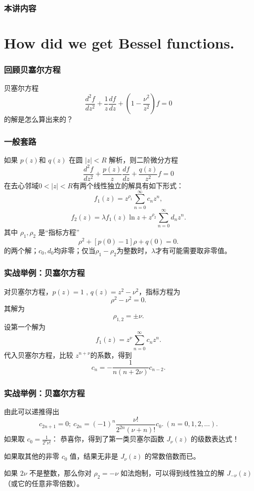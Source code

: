 \documentclass[CJK]{beamer}
\date{}
\begin{document}
  \bch
{}




\begin{frame}
\frametitle{本讲内容}
\tableofcontents
\end{frame}

\section{How did we get Bessel functions.}

\begin{frame}
  \frametitle{回顾贝塞尔方程}
  贝塞尔方程
  $$\frac{d^2f}{dz^2} + \frac{1}{z} \frac{df}{dz} + \left(1-\frac{\nu^2}{z^2}\right) f = 0 $$
  的解是怎么算出来的？
\end{frame}


\begin{frame}
  \frametitle{一般套路}
  如果  $p(z)$和 $q(z)$ 在圆 $|z|<R$ 解析，则二阶微分方程
  $$\frac{d^2f}{dz^2} + \frac{p(z)}{z} \frac{df}{dz} + \frac{q(z)}{z^2} f = 0 $$
  在去心邻域$0<|z|<R$有两个线性独立的解具有如下形式：
  $$ f_1(z) = z^{\rho_1}\sum_{n=0}^\infty c_nz^n,$$ 
  $$ f_2(z) = \lambda f_1(z) \ln z + z^{\rho_2}\sum_{n=0}^\infty d_n z^n.$$
  其中 $\rho_1,\rho_2$ 是“指标方程”
    $$\rho^2 + \left[p(0)-1\right]\rho + q(0) = 0. $$
  的两个解；$c_0,d_0$均非零；仅当$\rho_1-\rho_2$为整数时，$\lambda$才有可能需要取非零值。
\end{frame}


\begin{frame}
  \frametitle{实战举例：贝塞尔方程}
  对贝塞尔方程，$p(z) = 1$ , $q(z) = z^2-\nu^2$，指标方程为
  $$ \rho^2 - \nu^2 = 0 .$$
  其解为
  $$\rho_{1,2} = \pm \nu. $$
  设第一个解为
  $$ f_1(z) = z^\nu \sum_{n=0}^\infty c_n z^n. $$
  代入贝塞尔方程，比较 $z^{n+\nu}$的系数，得到
  $$  c_n  = -\frac{1}{n(n+2\nu)} c_{n-2}. $$
\end{frame}


\begin{frame}
  \frametitle{实战举例：贝塞尔方程}
  由此可以递推得出
  $$c_{2n+1}=0;\ c_{2n} = (-1)^n\frac{\nu !}{2^{2n}(\nu+n)!}c_0.\ (n=0,1,2,\ldots).$$
  如果取 $c_0=\frac{1}{2^\nu \nu!}$： 恭喜你，得到了第一类贝塞尔函数 $J_\nu(z)$ 的级数表达式！


  \skipline
  
  如果取其他的非零 $c_0$ 值，结果无非是 $J_\nu(z)$ 的常数倍数而已。

  \skipline

  如果 $2\nu$ 不是整数，那么你对 $\rho_2=-\nu$ 如法炮制，可以得到线性独立的解 $J_{-\nu}(z)$ （或它的任意非零倍数）。

\end{frame}
\end{document}
